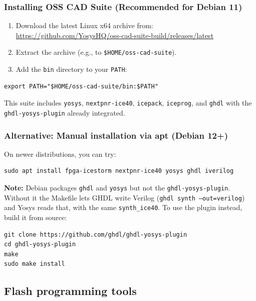 \documentclass[11pt,a4paper]{article}
\newcommand{\cmd}[1]{\texttt{#1}}
\newcommand{\file}[1]{\texttt{#1}}
\begin{document}
\subsubsection{Installing OSS CAD Suite (Recommended for Debian 11)}

\begin{enumerate}
    \item Download the latest Linux x64 archive from: \\
          \url{https://github.com/YosysHQ/oss-cad-suite-build/releases/latest}
    \item Extract the archive (e.g., to \file{\$HOME/oss-cad-suite}).
    \item Add the \file{bin} directory to your \cmd{PATH}:
\end{enumerate}

\begin{lstlisting}[style=shell]
export PATH="$HOME/oss-cad-suite/bin:$PATH"
\end{lstlisting}

This suite includes \cmd{yosys}, \cmd{nextpnr-ice40}, \cmd{icepack}, \cmd{iceprog}, and \cmd{ghdl} with the \cmd{ghdl-yosys-plugin} already integrated.

\subsubsection{Alternative: Manual installation via apt (Debian 12+)}

On newer distributions, you can try:

\begin{lstlisting}[style=shell]
sudo apt install fpga-icestorm nextpnr-ice40 yosys ghdl iverilog
\end{lstlisting}

\textbf{Note:} Debian packages \cmd{ghdl} and \cmd{yosys} but not the \cmd{ghdl-yosys-plugin}. Without it the Makefile lets GHDL write Verilog (\cmd{ghdl synth --out=verilog}) and Yosys reads that, with the same \cmd{synth\_ice40}. To use the plugin instead, build it from source:

\begin{lstlisting}[style=shell]
git clone https://github.com/ghdl/ghdl-yosys-plugin
cd ghdl-yosys-plugin
make
sudo make install
\end{lstlisting}

\subsection{Flash programming tools}
\end{document}
